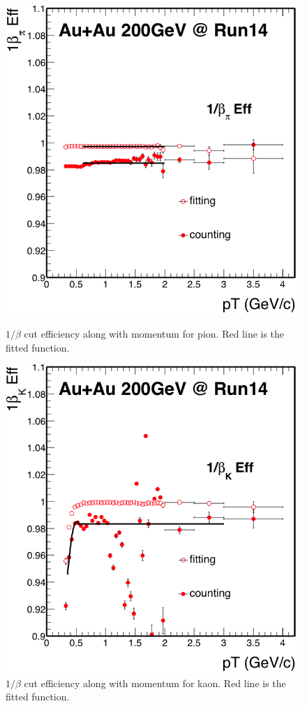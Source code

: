 \begin{figure}[htbp]
\begin{minipage}[htbp]{0.5\linewidth}
\centering
\includegraphics[width=1.0\textwidth]{figure/Run14_D0HFT/nSigPionTof_eff.png}
\caption{$1/\beta$ cut efficiency along with momentum for pion. Red line is the fitted function. \label{fig:piontofeff}}
\end{minipage}
\hfill
\begin{minipage}[htbp]{0.5\linewidth}
\centering
\includegraphics[width=1.0\textwidth]{figure/Run14_D0HFT/nSigKaonTof_eff.png}
\caption{$1/\beta$ cut efficiency along with momentum for kaon. Red line is the fitted function. \label{fig:kaontofeff}}
\end{minipage}
\end{figure}


